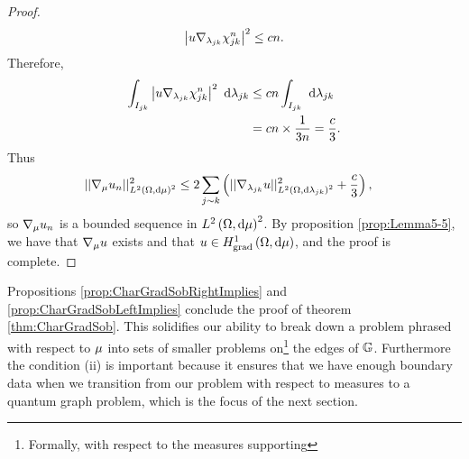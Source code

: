 \begin{proof}
	\begin{align*}
		\left\lvert u\nabla_{\lambda_{jk}}\chi_{jk}^n \right\rvert^2 \leq cn.
	\end{align*}
	Therefore,
	\begin{align*}
		\int_{I_{jk}}\left\lvert  u\nabla_{\lambda_{jk}}\chi_{jk}^n  \right\rvert^2 \ \mathrm{d}\lambda_{jk}
		&\leq cn\int_{I_{jk}} \ \mathrm{d}\lambda_{jk} \\
		&= cn\times\frac{1}{3n} = \frac{c}{3} .
	\end{align*}
	Thus
	\begin{align*}
		\lvert\lvert \nabla_{\mu}u_n \rvert\rvert_{L^{2}\left( \Omega,\mathrm{d}\mu \right)^2}^2
		&\leq 2\sum_{j\sim k}\left(  \lvert\lvert \nabla_{\lambda_{jk}}u \rvert\rvert_{L^{2}\left( \Omega,\mathrm{d}\lambda_{jk} \right)^2}^2 + \frac{c}{3} \right),
	\end{align*}
	so $\nabla_{\mu}u_n$ is a bounded sequence in $L^{2}\left( \Omega,\mathrm{d}\mu \right)^2$.
	By proposition \ref{prop:Lemma5-5}, we have that $\nabla_\mu u$ exists and that
	$u\in H^1_\mathrm{grad}\left( \Omega, \mathrm{d}\mu \right)$, and the proof is complete.
\end{proof}

Propositions \ref{prop:CharGradSobRightImplies} and \ref{prop:CharGradSobLeftImplies}  conclude the proof of theorem \ref{thm:CharGradSob}.
This solidifies our ability to break down a problem phrased with respect to $\mu$ into sets of smaller problems on\footnote{Formally, with respect to the measures supporting} the edges of $\mathbb{G}$.
Furthermore the condition (ii) is important because it ensures that we have enough boundary data when we transition from our problem with respect to measures to a quantum graph problem, which is the focus of the next section.

